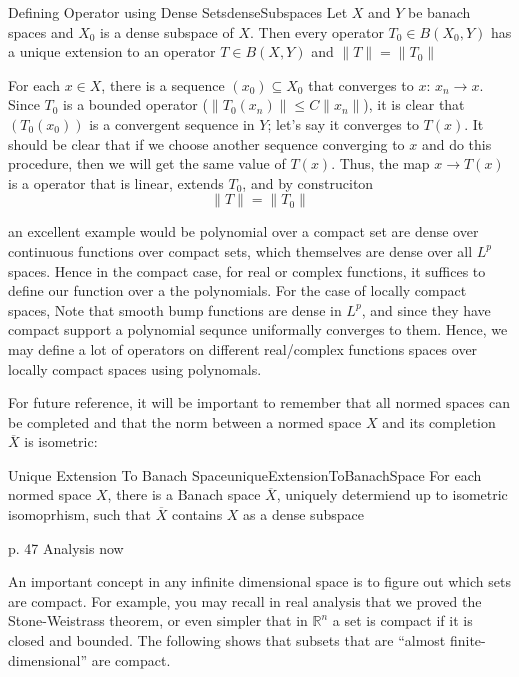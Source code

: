 \documentclass[oneside]{book}
\newcommand{\R}{\mathbb{R}}
\newcommand{\sse}{\subseteq}
\newcommand{\oln}{\overline}
\newcommand{\rw}{\rightarrow}
\begin{document}
\begin{prop}{Defining Operator using Dense Sets}{denseSubspaces}
	Let $X$ and $Y$ be banach spaces and $X_0$ is a dense subspace of $X$. Then every operator $T_0 \in
	B(X_0, Y)$ has a unique extension to an operator $T \in B(X, Y)$ and $\|T\| = \|T_0\|$
\end{prop}

\begin{Proof}
	For each $x \in X$, there is a sequence $(x_0) \sse X_0$ that converges to $x$: $x_n \rw x$. Since $T_0$ is
	a bounded operator ($\|T_0(x_n)\| \le C\|x_n\|$), it is clear that $(T_0(x_0))$ is a convergent sequence in
	$Y$; let's say it converges to $T(x)$. It should be clear that if we choose another sequence converging to $x$ and
	do this procedure, then we will get the same value of $T(x)$. Thus, the map $x \rw T(x)$ is a operator
	that is linear, extends $T_0$, and by construciton
	\[
		\|T\| = \|T_0\|
	\]
\end{Proof}

an excellent example would be polynomial over a compact set are dense over continuous functions over compact sets, which
themselves are dense over all $L^p$ spaces. Hence in the compact case, for real or complex functions, it suffices to
define our function over a the polynomials. For the case of locally compact spaces, Note that smooth bump functions are
dense in $L^p$, and since they have compact support a polynomial sequnce uniformally converges to them. Hence, we may
define a lot of operators on different real/complex functions spaces over locally compact spaces using polynomals.

For future reference, it will be important to remember that all normed spaces can be completed and that the norm between
a normed space $X$ and its completion $\oln{X}$ is isometric:

\begin{prop}{Unique Extension To Banach Space}{uniqueExtensionToBanachSpace}
	For each normed space $X$, there is a Banach space $\oln{X}$, uniquely determiend up to isometric
	isomoprhism, such that $\oln{X}$ contains $X$ as a dense subspace
\end{prop}

\begin{Proof}
	p. 47 Analysis now
\end{Proof}

An important concept in any infinite dimensional space is to figure out which sets are compact. For example, you may
recall in real analysis that we proved the Stone-Weistrass theorem, or even simpler that in $\R^n$ a set is compact if
it is closed and bounded. The following shows that subsets that are ``almost finite-dimensional'' are compact.
\end{document}
